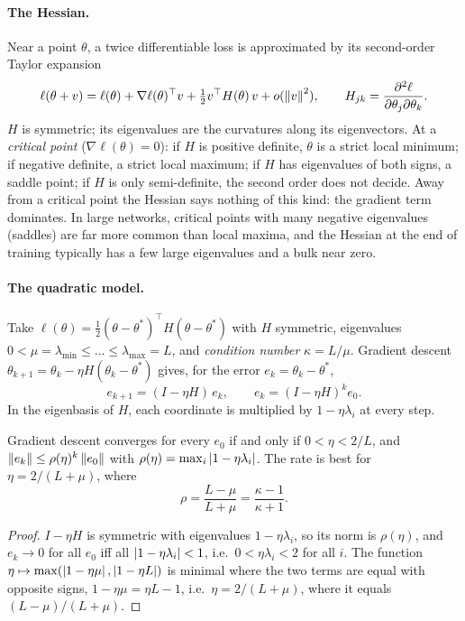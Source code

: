 \begin{notechapter}
\paragraph{The Hessian.} Near a point $\theta$, a twice differentiable loss is approximated by its
second-order Taylor expansion
\[
  \ell(\theta + v) = \ell(\theta) + \nabla\ell(\theta)^\top v + \tfrac12v^\top H(\theta)\,v + o(\left\|v\right\|^2),\qquad H_{jk} = \frac{\partial^2\ell}{\partial\theta_j\partial\theta_k} .
\]
$H$ is symmetric; its eigenvalues are the curvatures along its eigenvectors. At a
\emph{critical point} ($\nabla\ell(\theta) = 0$): if $H$ is positive definite, $\theta$ is a strict local minimum; if
negative definite, a strict local maximum; if $H$ has eigenvalues of both signs, a saddle
point; if $H$ is only semi-definite, the second order does not decide. Away from a critical
point the Hessian says nothing of this kind: the gradient term dominates. In large
networks, critical points with many negative eigenvalues (saddles) are far more common than
local maxima, and the Hessian at the end of training typically has a few large
eigenvalues and a bulk near zero.

\paragraph{The quadratic model.} Take $\ell(\theta) = \frac12(\theta - \theta^*)^\top H(\theta - \theta^*)$ with $H$ symmetric, eigenvalues
$0<\mu = \lambda_{\min}\leq\dots\leq\lambda_{\max} = L$, and \emph{condition number} $\kappa = L/\mu$. Gradient descent
$\theta_{k+1} = \theta_k - \eta H(\theta_k - \theta^*)$ gives, for the error $e_k = \theta_k - \theta^*$,
\[
  e_{k+1} = (I - \eta H)\,e_k,\qquad e_k = (I - \eta H)^ke_0 .
\]
In the eigenbasis of $H$, each coordinate is multiplied by $1 - \eta\lambda_i$ at every step.

\begin{theorem}\label{optimizers:thm:gd}
Gradient descent converges for every $e_0$ if and only if $0<\eta<2/L$, and
$\left\|e_k\right\|\leq\rho(\eta)^k\left\|e_0\right\|$ with $\rho(\eta) = \max_i\left|1 - \eta\lambda_i\right|$. The rate is best for $\eta = 2/(L + \mu)$, where
\[
  \rho = \frac{L - \mu}{L + \mu} = \frac{\kappa - 1}{\kappa + 1} .
\]
\end{theorem}

\begin{proof}
$I - \eta H$ is symmetric with eigenvalues $1 - \eta\lambda_i$, so its norm is $\rho(\eta)$, and $e_k\to0$ for all $e_0$ iff
all $\left|1 - \eta\lambda_i\right|<1$, i.e.\ $0<\eta\lambda_i<2$ for all $i$. The function $\eta\mapsto\max(\left|1 - \eta\mu\right|,\left|1 - \eta L\right|)$ is minimal where the two
terms are equal with opposite signs, $1 - \eta\mu = \eta L - 1$, i.e.\ $\eta = 2/(L + \mu)$, where it equals $(L - \mu)/(L + \mu)$.
\end{proof}


\end{notechapter}
